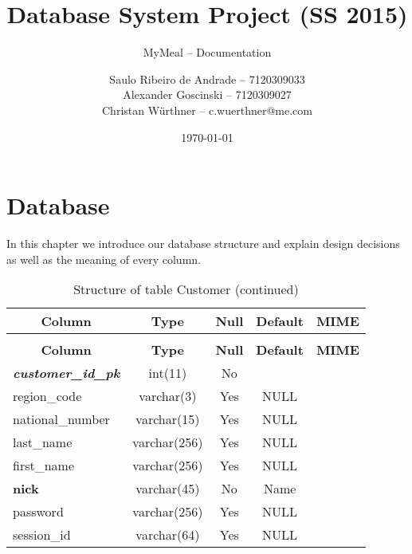 \documentclass[parskip=half, a4paper, DIV=14]{scrartcl}
\begin{document}
\title{Database System Project (SS 2015)}
\subtitle{MyMeal -- Documentation}
\author{Saulo Ribeiro de Andrade -- 7120309033\\
		Alexander Goscinski -- 7120309027\\
		Christan Würthner -- c.wuerthner@me.com}
\date{\today}
\maketitle

\tableofcontents
\newpage


\section{Database}
In this chapter we introduce our database structure and explain design decisions as well as the meaning of every column.

%
% 
% 

%
%

 \begin{longtable}{|l|c|c|c|l|} 
 \caption{Structure of table Customer} \label{tab:Customer-structure} \\
 \hline \multicolumn{1}{|c|}{\textbf{Column}} & \multicolumn{1}{|c|}{\textbf{Type}} & \multicolumn{1}{|c|}{\textbf{Null}} & \multicolumn{1}{|c|}{\textbf{Default}} & \multicolumn{1}{|c|}{\textbf{MIME}} \\ \hline \hline
\endfirsthead
 \caption{Structure of table Customer (continued)} \\ 
 \hline \multicolumn{1}{|c|}{\textbf{Column}} & \multicolumn{1}{|c|}{\textbf{Type}} & \multicolumn{1}{|c|}{\textbf{Null}} & \multicolumn{1}{|c|}{\textbf{Default}} & \multicolumn{1}{|c|}{\textbf{MIME}} \\ \hline \hline \endhead \endfoot 
\textbf{\textit{customer\_id\_pk}} & int(11) & No &  &  \\ \hline 
region\_code & varchar(3) & Yes & NULL &  \\ \hline 
national\_number & varchar(15) & Yes & NULL &  \\ \hline 
last\_name & varchar(256) & Yes & NULL &  \\ \hline 
first\_name & varchar(256) & Yes & NULL &  \\ \hline 
\textbf{nick} & varchar(45) & No & Name &  \\ \hline 
password & varchar(256) & Yes & NULL &  \\ \hline 
session\_id & varchar(64) & Yes & NULL &  \\ \hline 
 \end{longtable}
\end{document}

